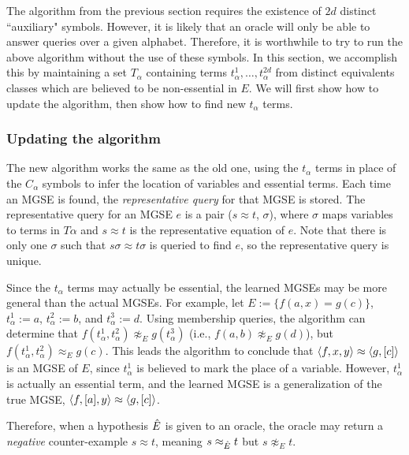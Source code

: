  
The algorithm from the previous section requires the existence of $2d$ distinct ``auxiliary" symbols. 
However, it is likely that an oracle will only be able to answer queries over a given alphabet. 
Therefore, it is worthwhile to try to run the above algorithm without the use of these symbols.
In this section, we accomplish this by maintaining a set $T_\alpha$ containing terms $t^1_\alpha, \dots, t^{2d}_\alpha$ from distinct equivalents classes which are believed to be non-essential in $E$.
We will first show how to update the algorithm, then show how to find new $t_\alpha$ terms.

\subsubsection{Updating the algorithm}
The new algorithm works the same as the old one, using the $t_\alpha$ terms in place of the $C_\alpha$ symbols to infer the location of variables and essential terms. 
Each time an MGSE is found, the \emph{representative query} for that MGSE is stored.
The representative query for an MGSE $e$ is a pair ($s\approx t$, $\sigma$), where $\sigma$ maps variables to terms in $T\alpha$ and $s\approx t$ is the representative equation of $e$.
Note that there is only one $\sigma$ such that $s\sigma \approx  t\sigma$  is queried to find $e$, so the representative query is unique.

Since the $t_\alpha$ terms may actually be essential, the learned MGSEs may be more general than the actual MGSEs. 
For example, let $E := \{ f(a,x) = g(c)\}$, $t^1_\alpha := a$, $t^2_\alpha := b$, and $t^3_\alpha := d$. 
Using membership queries, the algorithm can determine that $f(t^1_\alpha, t^2_\alpha) \not \approx_E g(t^3_\alpha)$ (i.e., $f(a,b) \not \approx_E g(d)$), but $f(t^1_\alpha, t^2_\alpha) \approx_E g(c)$.
This leads the algorithm to conclude that $\langle f,x,y \rangle \approx \langle g,[c] \rangle$ is an MGSE of $E$, since $t^1_\alpha$ is believed to mark the place of a variable.
However, $t^1_\alpha$ is actually an essential term, and the learned MGSE is a generalization of the true MGSE, $\langle f,[a],y \rangle \approx \langle g,[c] \rangle$. 

Therefore, when a hypothesis $\ahat{E}$ is given to an oracle, the oracle may return a \emph{negative} counter-example $s \approx t$, meaning $s \approx_{\ahat{E}} t$ but $s \not \approx_E t$. 

